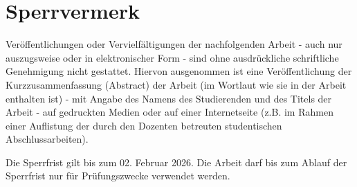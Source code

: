 \label{Sperrvermerk}

%


\section*{Sperrvermerk}

Veröffentlichungen oder Vervielfältigungen der nachfolgenden Arbeit - auch nur auszugsweise oder in elektronischer Form - sind ohne ausdrückliche schriftliche Genehmigung nicht gestattet.
Hiervon ausgenommen ist eine Veröffentlichung der Kurzzusammenfassung (Abstract) der Arbeit (im Wortlaut wie sie in der Arbeit enthalten ist) - mit Angabe des Namens des Studierenden und des Titels der Arbeit - auf gedruckten Medien oder auf einer Internetseite (z.B. im Rahmen einer Auflistung der durch den Dozenten betreuten studentischen Abschlussarbeiten).

Die Sperrfrist gilt bis zum 02. Februar 2026.
Die Arbeit darf bis zum Ablauf der Sperrfrist nur für Prüfungszwecke verwendet werden.
 

%
